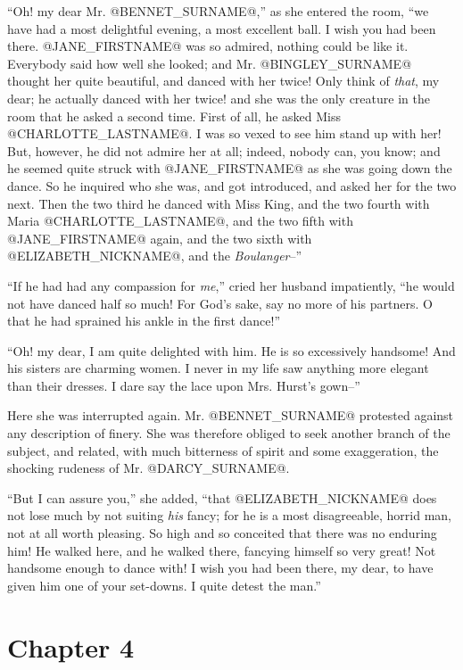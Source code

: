 ``Oh! my dear Mr. @BENNET_SURNAME@,'' as she entered the room, ``we have had a most
delightful evening, a most excellent ball. I wish you had been there.
@JANE_FIRSTNAME@ was so admired, nothing could be like it. Everybody said how well
she looked; and Mr. @BINGLEY_SURNAME@ thought her quite beautiful, and danced with
her twice! Only think of \textit{that}, my dear; he actually danced with her
twice! and she was the only creature in the room that he asked a second
time. First of all, he asked Miss @CHARLOTTE_LASTNAME@. I was so vexed to see him stand
up with her! But, however, he did not admire her at all; indeed, nobody
can, you know; and he seemed quite struck with @JANE_FIRSTNAME@ as she was going
down the dance. So he inquired who she was, and got introduced, and
asked her for the two next. Then the two third he danced with Miss King,
and the two fourth with Maria @CHARLOTTE_LASTNAME@, and the two fifth with @JANE_FIRSTNAME@ again,
and the two sixth with @ELIZABETH_NICKNAME@, and the \textit{Boulanger}--''

``If he had had any compassion for \textit{me},'' cried her husband impatiently,
``he would not have danced half so much! For God's sake, say no more of
his partners. O that he had sprained his ankle in the first dance!''

``Oh! my dear, I am quite delighted with him. He is so excessively
handsome! And his sisters are charming women. I never in my life saw
anything more elegant than their dresses. I dare say the lace upon Mrs.
Hurst's gown--''

Here she was interrupted again. Mr. @BENNET_SURNAME@ protested against any
description of finery. She was therefore obliged to seek another branch
of the subject, and related, with much bitterness of spirit and some
exaggeration, the shocking rudeness of Mr. @DARCY_SURNAME@.

``But I can assure you,'' she added, ``that @ELIZABETH_NICKNAME@ does not lose much by not
suiting \textit{his} fancy; for he is a most disagreeable, horrid man, not at
all worth pleasing. So high and so conceited that there was no enduring
him! He walked here, and he walked there, fancying himself so very
great! Not handsome enough to dance with! I wish you had been there, my
dear, to have given him one of your set-downs. I quite detest the man.''



\chapter*{Chapter 4}


